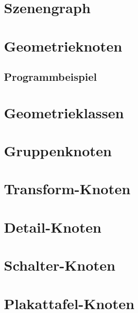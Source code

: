\section{Szenengraph}

\section{Geometrieknoten}
\subsection{Programmbeispiel}

\section{Geometrieklassen}

\section{Gruppenknoten}


\section{Transform-Knoten}


\section{Detail-Knoten}

\section{Schalter-Knoten}

\section{Plakattafel-Knoten}


